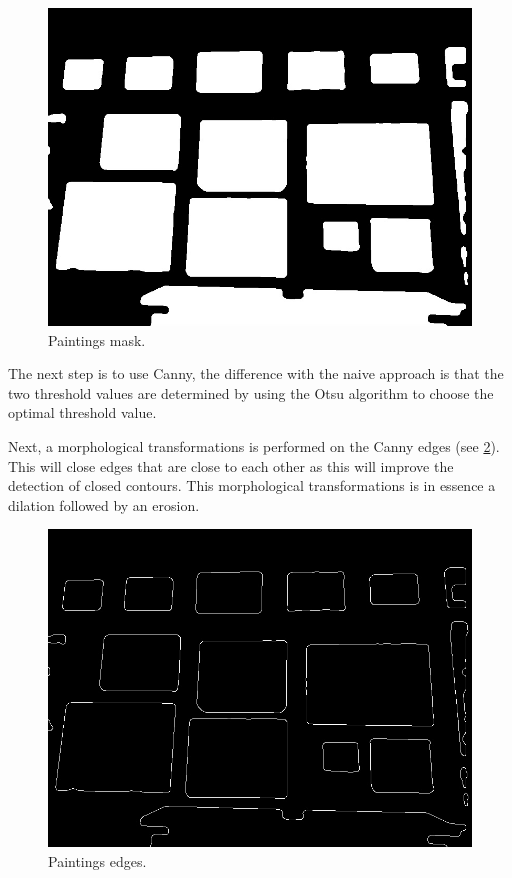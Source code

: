 \begin{figure}[h]
    \includegraphics[width=\linewidth]{images/IMG_20190323_121447_paintings-mask.jpg}
    \caption{Paintings mask.}
    \label{fig:paiting_detection_paintings-mask}
\end{figure}

The next step is to use Canny, the difference with the naive approach is that the two threshold values are determined by using the Otsu algorithm to choose the optimal threshold value.

Next, a morphological transformations is performed on the Canny edges (see \ref{fig:paiting_detection_paintings-edges}). This will close edges that are close to each other as this will improve the detection of closed contours. This morphological transformations is in essence a dilation followed by an erosion.

\begin{figure}[h]
    \includegraphics[width=\linewidth]{images/IMG_20190323_121447_edges.jpg}
    \caption{Paintings edges.}
    \label{fig:paiting_detection_paintings-edges}
\end{figure}

